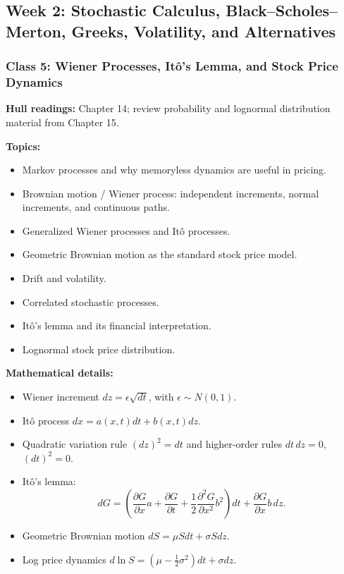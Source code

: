\documentclass[11pt]{article}
\begin{document}
\subsection*{Week 2: Stochastic Calculus, Black--Scholes--Merton, Greeks, Volatility, and Alternatives}

\subsubsection*{Class 5: Wiener Processes, It\^o's Lemma, and Stock Price Dynamics}
\textbf{Hull readings:} Chapter 14; review probability and lognormal distribution material from Chapter 15.

\textbf{Topics:}
\begin{itemize}
    \item Markov processes and why memoryless dynamics are useful in pricing.
    \item Brownian motion / Wiener process: independent increments, normal increments, and continuous paths.
    \item Generalized Wiener processes and It\^o processes.
    \item Geometric Brownian motion as the standard stock price model.
    \item Drift and volatility.
    \item Correlated stochastic processes.
    \item It\^o's lemma and its financial interpretation.
    \item Lognormal stock price distribution.
\end{itemize}

\textbf{Mathematical details:}
\begin{itemize}
    \item Wiener increment $dz=\epsilon\sqrt{dt}$, with $\epsilon\sim N(0,1)$.
    \item It\^o process $dx=a(x,t)dt+b(x,t)dz$.
    \item Quadratic variation rule $(dz)^2=dt$ and higher-order rules $dt\,dz=0$, $(dt)^2=0$.
    \item It\^o's lemma:
    \[
        dG=\left(\frac{\partial G}{\partial x}a+\frac{\partial G}{\partial t}
        +\frac{1}{2}\frac{\partial^2G}{\partial x^2}b^2\right)dt
        +\frac{\partial G}{\partial x}b\,dz.
    \]
    \item Geometric Brownian motion $dS=\mu Sdt+\sigma Sdz$.
    \item Log price dynamics $d\ln S=(\mu-\frac{1}{2}\sigma^2)dt+\sigma dz$.
\end{itemize}
\end{document}
